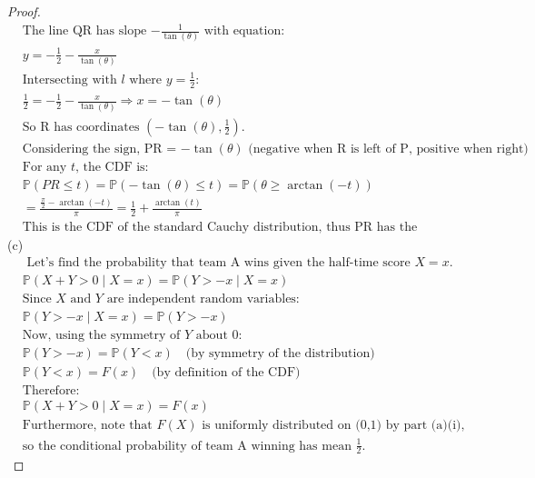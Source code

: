 \documentclass[letterpaper, 11pt]{article}
\newcommand{\1}{\mathds{1}}	%
\theoremstyle{definition}
\begin{document}
\begin{proof}
\begin{align*}
                &\text{The line QR has slope $-\frac{1}{\tan(\theta)}$ with equation:}\\
                &y = -\frac{1}{2} - \frac{x}{\tan(\theta)}\\
                &\text{Intersecting with $l$ where $y = \frac{1}{2}$:}\\
                &\frac{1}{2} = -\frac{1}{2} - \frac{x}{\tan(\theta)} \Rightarrow x = -\tan(\theta)\\
                &\text{So R has coordinates $(-\tan(\theta), \frac{1}{2})$.}\\
                &\text{Considering the sign, PR = $-\tan(\theta)$ (negative when R is left of P, positive when right)}\\
                &\text{For any $t$, the CDF is:}\\
                &\mathbb{P}(PR \leq t) = \mathbb{P}(-\tan(\theta) \leq t) = \mathbb{P}(\theta \geq \arctan(-t))\\
                &= \frac{\frac{\pi}{2} - \arctan(-t)}{\pi} = \frac{1}{2} + \frac{\arctan(t)}{\pi}\\
                &\text{This is the CDF of the standard Cauchy distribution, thus PR has the Cauchy distribution.}
\end{align*}
(c)
\begin{align*}
    &\text{ Let's find the probability that team A wins given the half-time score } X = x.\\
    &\mathbb{P}(X + Y > 0 \mid X = x) = \mathbb{P}(Y > -x \mid X = x)\\
    &\text{Since } X \text{ and } Y \text{ are independent random variables:}\\
    &\mathbb{P}(Y > -x \mid X = x) = \mathbb{P}(Y > -x)\\
    &\text{Now, using the symmetry of } Y \text{ about 0:}\\
    &\mathbb{P}(Y > -x) = \mathbb{P}(Y < x) \quad \text{(by symmetry of the distribution)}\\
    &\mathbb{P}(Y < x) = F(x) \quad \text{(by definition of the CDF)}\\
    &\text{Therefore:}\\
    &\mathbb{P}(X + Y > 0 \mid X = x) = F(x)\\
    &\text{Furthermore, note that } F(X) \text{ is uniformly distributed on (0,1) by part (a)(i),}\\
    &\text{so the conditional probability of team A winning has mean } \frac{1}{2}.
    \end{align*}
    \end{proof}
\end{document}
